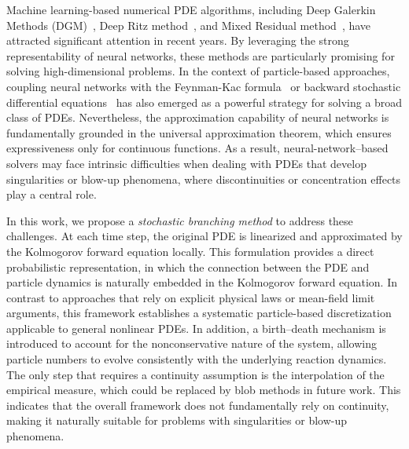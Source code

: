 \documentclass[12pt]{article}
\begin{document}
Machine learning-based numerical PDE algorithms, including  Deep Galerkin Methods (DGM)~\cite{sirignano2018dgm}, Deep Ritz method~\cite{yu2018deep}, and Mixed Residual method~\cite{lyu2022mim}, have attracted significant attention in recent years. By leveraging the strong representability of neural networks, these methods are particularly promising for solving high-dimensional problems. In the context of particle-based approaches, coupling neural networks with the Feynman-Kac formula~\cite{han2024deep, hutzenthaler2021speed, nguwi2024deep,beck2021deep} or backward stochastic differential equations~\cite{han2017deep, han2018solving, hure2020deep} has also emerged as a powerful strategy for solving a broad class of PDEs. Nevertheless, the approximation capability of neural networks is fundamentally grounded in the universal approximation theorem, which ensures expressiveness only for continuous functions. As a result, neural-network–based solvers may face intrinsic difficulties when dealing with PDEs that develop singularities or blow-up phenomena, where discontinuities or concentration effects play a central role.

In this work, we propose a \textit{stochastic branching method} to address these challenges. 
At each time step, the original PDE is linearized and approximated by the Kolmogorov forward equation locally. This formulation provides a direct probabilistic representation, in which the connection between the PDE and particle dynamics is naturally embedded in the Kolmogorov forward equation. In contrast to approaches that rely on explicit physical laws or mean-field limit arguments, this framework establishes a systematic particle-based discretization applicable to general nonlinear PDEs. 
In addition, a birth–death mechanism is introduced to account for the nonconservative nature of the system, allowing particle numbers to evolve consistently with the underlying reaction dynamics.  
The only step that requires a continuity assumption is the interpolation of the empirical measure, which could be replaced by blob methods in future work. This indicates that the overall framework does not fundamentally rely on continuity, making it naturally suitable for problems with singularities or blow-up phenomena.
\end{document}
